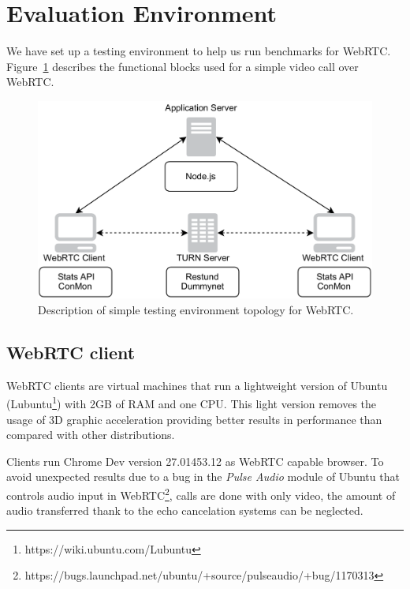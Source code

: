 \section{Evaluation Environment}
\label{sec:testingEnv}

\thispagestyle{empty}

We have set up a testing environment to help us run benchmarks for WebRTC. Figure~\ref{fig:evaluation_arch} describes the functional blocks used for a simple video call over WebRTC.

 \begin{figure}[h]
  \centering
    \includegraphics[width=1\textwidth]{./figures/evaluation_arch.pdf}
      \caption[Description of simple testing environment topology for WebRTC]{Description of simple testing environment topology for WebRTC.}
	\label{fig:evaluation_arch}
\end{figure}

\subsection{WebRTC client}

WebRTC clients are virtual machines that run a lightweight version of Ubuntu (Lubuntu\footnote{https://wiki.ubuntu.com/Lubuntu}) with 2GB of RAM and one CPU. This light version removes the usage of 3D graphic acceleration providing better results in performance than compared with other distributions. 

Clients run Chrome Dev version 27.01453.12 as WebRTC capable browser. To avoid unexpected results due to a bug in the {\it Pulse Audio} module of Ubuntu that controls audio input in WebRTC\footnote{https://bugs.launchpad.net/ubuntu/+source/pulseaudio/+bug/1170313}, calls are done with only video, the amount of audio transferred thank to the echo cancelation systems can be neglected.

